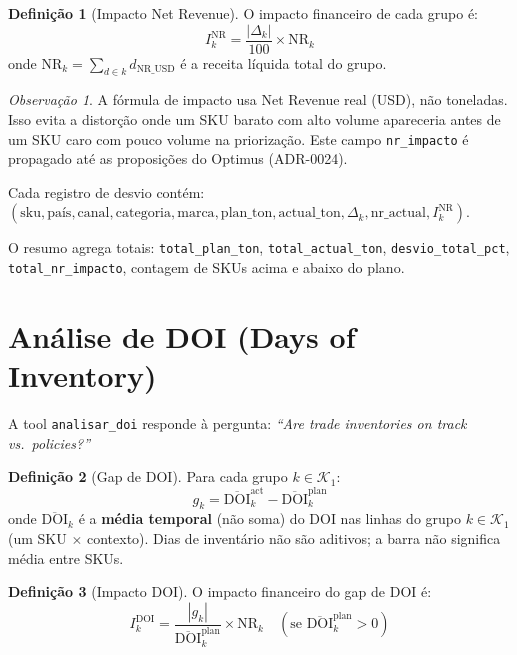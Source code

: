 \documentclass[a4paper, 12pt]{report}
\theoremstyle{definition}
\newtheorem{definicao}{Defini\c{c}\~ao}[chapter]
\theoremstyle{remark}
\newtheorem{observacao}{Observa\c{c}\~ao}[chapter]
\newcommand{\abs}[1]{\left|#1\right|}
\begin{document}
\begin{definicao}[Impacto Net Revenue]
  O impacto financeiro de cada grupo \'e:
  \[
    I^{\text{NR}}_k = \frac{\abs{\Delta_k}}{100} \times \text{NR}_k
  \]
  onde $\text{NR}_k = \sum_{d \in k} d_{\text{NR\_USD}}$ \'e a receita
  l\'iquida total do grupo.
\end{definicao}

\begin{observacao}
  A f\'ormula de impacto usa Net Revenue real (USD), n\~ao toneladas.
  Isso evita a distor\c{c}\~ao onde um SKU barato com alto volume apareceria
  antes de um SKU caro com pouco volume na prioriza\c{c}\~ao.
  Este campo \texttt{nr\_impacto} \'e propagado at\'e as proposi\c{c}\~oes
  do Optimus (ADR-0024).
\end{observacao}

Cada registro de desvio cont\'em:
$(\text{sku}, \text{pa\'is}, \text{canal}, \text{categoria}, \text{marca},
\text{plan\_ton}, \text{actual\_ton}, \Delta_k, \text{nr\_actual}, I^{\text{NR}}_k)$.

O resumo agrega totais: \texttt{total\_plan\_ton}, \texttt{total\_actual\_ton},
\texttt{desvio\_total\_pct}, \texttt{total\_nr\_impacto}, contagem de SKUs
acima e abaixo do plano.


\section{An\'alise de DOI (Days of Inventory)}

A tool \texttt{analisar\_doi} responde \`a pergunta:
\textit{``Are trade inventories on track vs.\ policies?''}

\begin{definicao}[Gap de DOI]
  Para cada grupo $k \in \mathcal{K}_1$:
  \[
    g_k = \overline{\text{DOI}}^{\text{act}}_k - \overline{\text{DOI}}^{\text{plan}}_k
  \]
  onde $\overline{\text{DOI}}_k$ \'e a \textbf{m\'edia temporal} (n\~ao soma)
  do DOI nas linhas do grupo $k\in\mathcal{K}_1$ (um SKU $\times$
  contexto). Dias de invent\'ario n\~ao s\~ao aditivos; a barra n\~ao
  significa m\'edia entre SKUs.
\end{definicao}

\begin{definicao}[Impacto DOI]
  O impacto financeiro do gap de DOI \'e:
  \[
    I^{\text{DOI}}_k = \frac{\abs{g_k}}{\overline{\text{DOI}}^{\text{plan}}_k}
    \times \text{NR}_k
    \quad (\text{se } \overline{\text{DOI}}^{\text{plan}}_k > 0)
  \]
\end{definicao}
\end{document}
